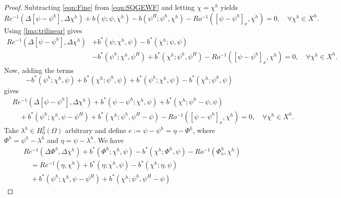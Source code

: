 \begin{proof}
  Subtracting \eqref{eqn:Fine} from \eqref{eqn:SQGEWF} and letting $\chi=\chi^h$
  yields
  \begin{equation*}
    Re^{-1} (\Delta \left[\psi - \psi^h\right], \Delta \chi^h) + b(\psi;\psi,\chi^h)
      - b(\psi^H;\psi^h,\chi^h) - Ro^{-1} (\left[\psi-\psi^h\right]_x,\chi^h)
      = 0, \quad \forall \chi^h \in X^h.
  \end{equation*}
  Using \autoref{lma:trilinear} gives
  \begin{equation*}
    \begin{split}
      Re^{-1} \left(\Delta \left[\psi - \psi^h\right], \Delta \chi^h\right)
        &+ b^*(\psi;\chi^h, \psi) - b^*(\chi^h;\psi,\psi) \\
      &- b^*(\psi^h;\chi^h,\psi^H) + b^*(\chi^h; \psi^h,\psi^H)
        - Ro^{-1} \left(\left[\psi-\psi^h\right]_x,\chi^h \right) = 0,
      \quad \forall \chi^h \in X^h.
    \end{split}
  \end{equation*}
  Now, adding the terms
  \begin{equation*}
    -b^*(\psi^h;\chi^h,\psi) + b^*(\chi^h;\psi^h,\psi) + b^*(\psi^h;\chi^h,\psi) - b^*(\chi^h;\psi^h,\psi)
  \end{equation*}
  gives
  \begin{equation*}
    \begin{split}
      &Re^{-1} (\Delta \left[\psi - \psi^h\right], \Delta \chi^h)
        + b^*(\psi-\psi^h;\chi^h, \psi) + b^*(\chi^h;\psi^h-\psi,\psi) \\
      &\quad+ b^*(\psi^h;\chi^h,\psi-\psi^H) + b^*(\chi^h; \psi^h,\psi^H-\psi)
        - Ro^{-1} (\left[\psi-\psi^h\right]_x,\chi^h) = 0,
    \quad \forall \chi^h \in X^h.
      \end{split}
  \end{equation*}
  Take $\lambda^h\in H^2_0(\Omega)$ arbitrary and define $e:= \psi - \psi^h =
  \eta - \Phi^h$, where $\Phi^h = \psi^h-\lambda^h$ and $\eta=\psi-\lambda^h$.
  We have
  \begin{equation*}
    \begin{split}
      &Re^{-1}(\Delta \Phi^h, \Delta \chi^h)
        + b^*(\Phi^h;\chi^h, \psi) - b^*(\chi^h;\Phi^h,\psi)
        - Ro^{-1} (\Phi^h_x,\chi^h) \\
      &\quad = Re^{-1} (\eta,\chi^h)
        + b^*(\eta;\chi^h, \psi) - b^*(\chi^h;\eta,\psi) \\
      &\quad+ b^*(\psi^h;\chi^h,\psi-\psi^H) + b^*(\chi^h; \psi^h,\psi^H-\psi)

\end{split}
\end{equation*}
\end{proof}
